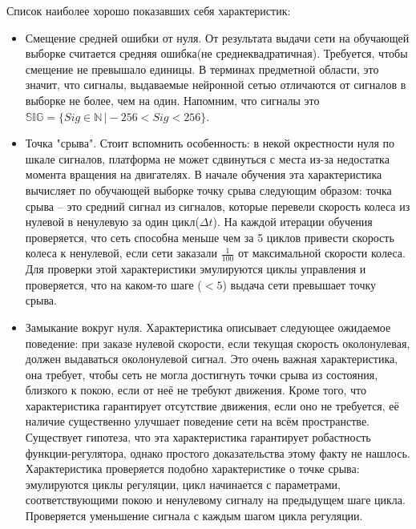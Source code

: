 \documentclass[14pt]{extreport}
\begin{document}
                Список наиболее хорошо показавших себя характеристик:
                    \begin{itemize}
                      \item Смещение средней ошибки от нуля. От результата выдачи сети на обучающей выборке считается средняя ошибка(не среднеквадратичная). Требуется, чтобы смещение не превышало единицы. В терминах предметной области, это значит, что сигналы, выдаваемые нейронной сетью отличаются от сигналов в выборке не более, чем на один. Напомним, что сигналы это $\mathbb{SIG} = \{Sig \in \mathbb{N}\,\vert -256 < Sig < 256\}$.
                      \item Точка "срыва". Стоит вспомнить особенность: в некой окрестности нуля по шкале сигналов, платформа не может сдвинуться с места из-за недостатка момента вращения на двигателях. В начале обучения эта характеристика вычисляет по обучающей выборке точку срыва следующим образом: точка срыва -- это средний сигнал из сигналов, которые перевели скорость колеса из нулевой в ненулевую за один цикл(\(\Delta t\)). На каждой итерации обучения проверяется, что сеть способна меньше чем за 5 циклов привести скорость колеса к ненулевой, если сети заказали $\frac{1}{100}$ от максимальной скорости колеса. Для проверки этой характеристики эмулируются циклы управления и проверяется, что на каком-то шаге ($<5$) выдача сети превышает точку срыва.
                      \item Замыкание вокруг нуля. Характеристика описывает следующее ожидаемое поведение: при заказе нулевой скорости, если текущая скорость околонулевая, должен выдаваться околонулевой сигнал. Это очень важная характеристика, она требует, чтобы сеть не могла достигнуть точки срыва из состояния, близкого к покою, если от неё не требуют движения. Кроме того, что характеристика гарантирует отсутствие движения, если оно не требуется, её наличие существенно улучшает поведение сети на всём пространстве. Существует гипотеза, что эта характеристика гарантирует робастность функции-регулятора, однако простого доказательства этому факту не нашлось. Характеристика проверяется подобно характеристике о точке срыва: эмулируются циклы регуляции, цикл начинается с параметрами, соответствующими покою и ненулевому сигналу на предыдущем шаге цикла. Проверяется уменьшение сигнала с каждым шагом цикла регуляции.
                    \end{itemize}
                
\end{document}
